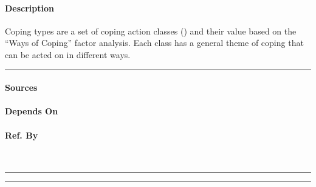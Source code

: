 \paragraph{Description} Coping types are a set of coping action classes
() and their value based on the ``Ways of Coping'' factor
analysis. Each class has a general theme of coping that can be acted on in
different ways. \\\hrule

\paragraph{Sources} \cite{copingquestions}

\paragraph{Depends On} 

\paragraph{Ref. By}  \\\hrule\vspace{0.5mm}\hrule

~\newline

